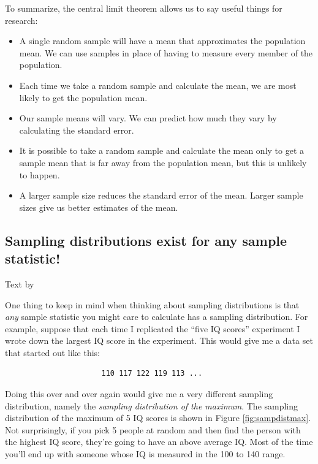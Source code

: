 \documentclass[
]{book}
\begin{document}
To summarize, the central limit theorem allows us to say useful things for research:

\begin{itemize}
\item
  A single random sample will have a mean that approximates the population mean. We can use samples in place of having to measure every member of the population.
\item
  Each time we take a random sample and calculate the mean, we are most likely to get the population mean.
\item
  Our sample means will vary. We can predict how much they vary by calculating the standard error.
\item
  It is possible to take a random sample and calculate the mean only to get a sample mean that is far away from the population mean, but this is unlikely to happen.
\item
  A larger sample size reduces the standard error of the mean. Larger sample sizes give us better estimates of the mean.
\end{itemize}

\hypertarget{sampling-distributions-exist-for-any-sample-statistic}{%
\subsection{Sampling distributions exist for any sample statistic!}\label{sampling-distributions-exist-for-any-sample-statistic}}

Text by \citet{Navarro2018}

One thing to keep in mind when thinking about sampling distributions is that \emph{any} sample statistic you might care to calculate has a sampling distribution. For example, suppose that each time I replicated the ``five IQ scores'' experiment I wrote down the largest IQ score in the experiment. This would give me a data set that started out like this:

\begin{verbatim}
                      110 117 122 119 113 ... 
\end{verbatim}

Doing this over and over again would give me a very different sampling distribution, namely the \emph{sampling distribution of the maximum}. The sampling distribution of the maximum of 5 IQ scores is shown in Figure \ref{fig:sampdistmax}. Not surprisingly, if you pick 5 people at random and then find the person with the highest IQ score, they're going to have an above average IQ. Most of the time you'll end up with someone whose IQ is measured in the 100 to 140 range.
\end{document}
